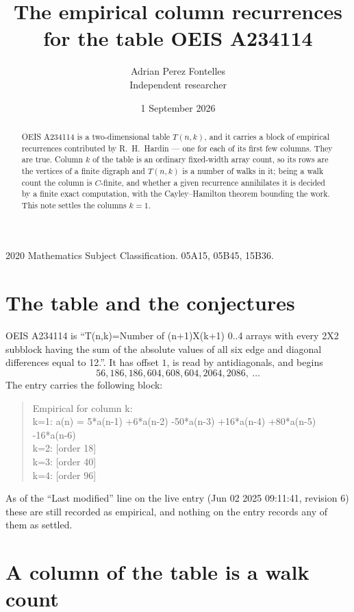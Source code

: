\documentclass[11pt,a4paper]{article}
\title{The empirical column recurrences for the table OEIS A234114}
\author{Adrian Perez Fontelles\\ \small Independent researcher}
\date{1 September 2026}
\theoremstyle{plain}
\theoremstyle{definition}
\begin{document}
\maketitle

\begin{abstract}
OEIS A234114 is a two-dimensional table $T(n,k)$, and it carries a block of empirical
recurrences contributed by R.~H.~Hardin --- one for each of its first few columns. They are
true. Column $k$ of the table is an ordinary fixed-width array count, so its rows are the
vertices of a finite digraph and $T(n,k)$ is a number of walks in it; being a walk count the
column is $C$-finite, and whether a given recurrence annihilates it is decided by a finite
exact computation, with the Cayley--Hamilton theorem bounding the work. This note settles the
columns $k=1$.
\end{abstract}

\noindent\small 2020 Mathematics Subject Classification. 05A15, 05B45, 15B36.\normalsize

\section{The table and the conjectures}

OEIS A234114 is ``T(n,k)=Number of (n+1)X(k+1) 0..4 arrays with every 2X2 subblock having the sum of the absolute values of all six edge and diagonal differences equal to 12.''. It has offset $1$, is
read by antidiagonals, and begins
\[
56, 186, 186, 604, 608, 604, 2064, 2086,\ \dots
\]
The entry carries the following block:
\begin{quote}\small
Empirical for column k:\\
k=1: a(n) = 5*a(n-1) +6*a(n-2) -50*a(n-3) +16*a(n-4) +80*a(n-5) -16*a(n-6)\\
k=2: [order 18]\\
k=3: [order 40]\\
k=4: [order 96]\\
\end{quote}
As of the ``Last modified'' line on the live entry (Jun 02 2025 09:11:41, revision 6) these are still
recorded as empirical, and nothing on the entry records any of them as settled.

\section{A column of the table is a walk count}
\end{document}
